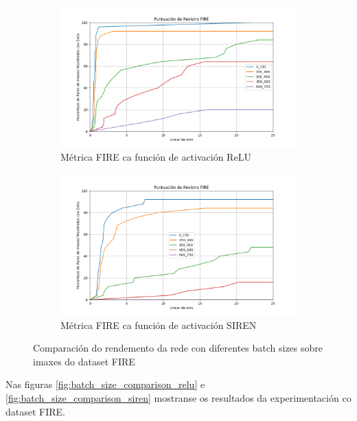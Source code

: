 \begin{figure}[tbp]
    \centering
    \begin{subfigure}[b]{0.5\textwidth}
        \centering
        \includegraphics[width=\textwidth]{imaxes/FIRE_scores/fire_registration_scores_RFMID_MLP.png}
        \caption{Métrica FIRE ca función de activación ReLU}
        \label{fig:FIRERFMID_relu}
    \end{subfigure}\hfill
    \begin{subfigure}[b]{0.5\textwidth}
        \centering
        \includegraphics[width=\textwidth]{imaxes/FIRE_scores/fire_registration_scores_RMIFD_SIREN.png}
        \caption{Métrica FIRE ca función de activación SIREN}
        \label{fig:FIRERFMID_SIREN}
    \end{subfigure}
    \caption{Comparación do rendemento da rede con diferentes batch sizes sobre imaxes do dataset FIRE}
    \label{fig:FIRERFMID_scores}
\end{figure}


Nas figuras \ref{fig:batch_size_comparison_relu} e \ref{fig:batch_size_comparison_siren} mostranse os resultados da experimentación co dataset FIRE.

